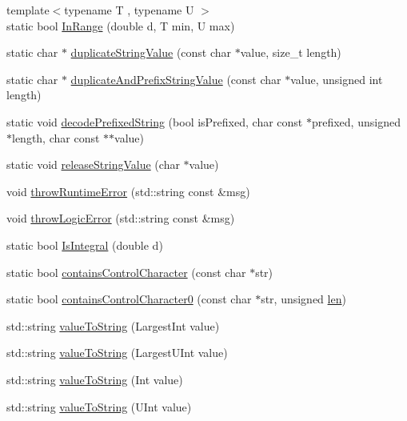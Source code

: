 \begin{DoxyCompactItemize}
\item 
{\footnotesize template$<$typename T , typename U $>$ }\\static bool \hyperlink{namespace_json_aff0180507262a244de61b961178d7443}{In\+Range} (double d, T min, U max)
\item 
static char $\ast$ \hyperlink{namespace_json_a678ac3a60cd70ec0fb4c9abfd40eb0c4}{duplicate\+String\+Value} (const char $\ast$value, size\+\_\+t length)
\item 
static char $\ast$ \hyperlink{namespace_json_a9795a09a0141d1f12d307c4386aeaee6}{duplicate\+And\+Prefix\+String\+Value} (const char $\ast$value, unsigned int length)
\item 
static void \hyperlink{namespace_json_aad8b4982c1acd164f541fba396ac9fb1}{decode\+Prefixed\+String} (bool is\+Prefixed, char const $\ast$prefixed, unsigned $\ast$length, char const $\ast$$\ast$value)
\item 
static void \hyperlink{namespace_json_acf8dd162c01e37846e129556c50e4037}{release\+String\+Value} (char $\ast$value)
\item 
void \hyperlink{namespace_json_a97f039a107b3f6cf1c3edee50e978f76}{throw\+Runtime\+Error} (std\+::string const \&msg)
\item 
void \hyperlink{namespace_json_a27613326e9e36bbfe04a905ac90caa91}{throw\+Logic\+Error} (std\+::string const \&msg)
\item 
static bool \hyperlink{namespace_json_a1a04cc9d31e64b5912dade003c9b99b5}{Is\+Integral} (double d)
\item 
static bool \hyperlink{namespace_json_aa11b210ff98a4f4dd4e2df19260f8c3a}{contains\+Control\+Character} (const char $\ast$str)
\item 
static bool \hyperlink{namespace_json_ae8a357381f264cf28f46449e79ab1dea}{contains\+Control\+Character0} (const char $\ast$str, unsigned \hyperlink{client_8cpp_afed088663f8704004425cdae2120b9b3}{len})
\item 
std\+::string \hyperlink{namespace_json_abd9c650f70d9434f98f9025e2e2faf2d}{value\+To\+String} (Largest\+Int value)
\item 
std\+::string \hyperlink{namespace_json_a3f46b0bc62b95a9426a2da0117bdf9f0}{value\+To\+String} (Largest\+U\+Int value)
\item 
std\+::string \hyperlink{namespace_json_a5d3eba6789f9a9c1ab563ff8b4a5090f}{value\+To\+String} (Int value)
\item 
std\+::string \hyperlink{namespace_json_a4d43b0ff222bd3975bcf1babca0b978f}{value\+To\+String} (U\+Int value)
\item 
$$
\end{DoxyCompactItemize}
